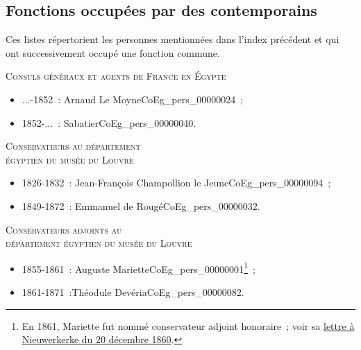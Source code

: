 \documentclass{book}
\begin{document}
{\cleardoublepage
{}
{}

\cleardoublepage
{}
{}
\printnoidxglossary[type={contemp}]

\cleardoublepage
\subsection*{Fonctions occupées par des contemporains}
{}
Ces listes répertorient les personnes mentionnées dans l’index précédent et qui ont successivement occupé une fonction commune.\\

\begin{center} \textsc{Consuls généraux et agents de France en Égypte}\end{center} \begin{itemize}
\item ...-1852~: Arnaud Le Moyne\gls{CoEg_pers_00000024}~;
\item 1852-...~: Sabatier\gls{CoEg_pers_00000040}. \end{itemize}

\begin{center} \textsc{Conservateurs au département\\
égyptien du musée du Louvre}\end{center} \begin{itemize}
\item 1826-1832~: Jean-François Champollion le Jeune\gls{CoEg_pers_00000094}~;
\item 1849-1872~: Emmanuel de Rougé\gls{CoEg_pers_00000032}. \end{itemize}

\begin{center} \textsc{Conservateurs adjoints au\\
département égyptien du musée du Louvre}\end{center} \begin{itemize}
\item 1855-1861~: Auguste Mariette\gls{CoEg_pers_00000001}\footnote{En 1861, Mariette fut nommé conservateur adjoint honoraire~; voir sa \hyperlink{CoEg_Mariette_1860-12-20}{lettre à Nieuwerkerke du 20 décembre 1860}.}~;
\item 1861-1871~:Théodule Devéria\gls{CoEg_pers_00000082}. \end{itemize}

}
\end{document}
